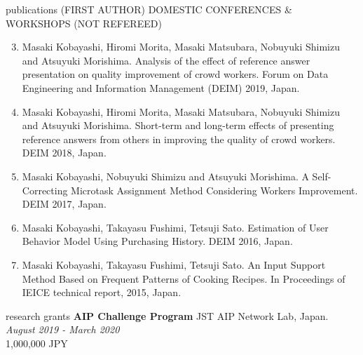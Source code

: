 \documentclass{resume} %
\begin{document}
\begin{rSection}{publications (FIRST AUTHOR)}
DOMESTIC CONFERENCES \& WORKSHOPS (NOT REFEREED)
\begin{enumerate}
  \setcounter{enumi}{2}
  \item Masaki Kobayashi, Hiromi Morita, Masaki Matsubara, Nobuyuki Shimizu and Atsuyuki Morishima. Analysis of the effect of reference answer presentation on quality improvement of crowd workers. Forum on Data Engineering
  and Information Management (DEIM) 2019, Japan.
  \item Masaki Kobayashi, Hiromi Morita, Masaki Matsubara, Nobuyuki Shimizu and Atsuyuki Morishima. Short-term and long-term effects of presenting reference answers from others in improving the quality of crowd workers. DEIM 2018, Japan.
  \item Masaki Kobayashi, Nobuyuki Shimizu and Atsuyuki Morishima. A Self-Correcting Microtask Assignment Method Considering Workers Improvement. DEIM 2017, Japan.
  \item Masaki Kobayashi, Takayasu Fushimi, Tetsuji Sato. Estimation of User Behavior Model Using Purchasing History. DEIM 2016, Japan.
  \item Masaki Kobayashi, Takayasu Fushimi, Tetsuji Sato. An Input Support Method Based on Frequent Patterns of Cooking Recipes. In Proceedings of IEICE technical report, 2015, Japan.
\end{enumerate}
\end{rSection}




\begin{rSection}{research grants}
{\bf AIP Challenge Program } JST AIP Network Lab, Japan. \hfill {\em August 2019 - March 2020}
\\1,000,000 JPY

\end{rSection}
\end{document}
